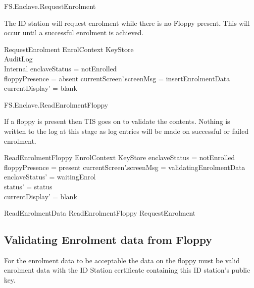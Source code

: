 \begin{traceunit}{FS.Enclave.RequestEnrolment}
\end{traceunit}


The ID station will request enrolment while there is no Floppy
present. This will occur until a successful enrolment is achieved.

\begin{schema}{RequestEnrolment}
        EnrolContext
\also
        \Xi KeyStore
\\      \Xi AuditLog
\\      \Xi Internal
\where
        enclaveStatus = notEnrolled
\\      floppyPresence = absent
\also
        currentScreen'.screenMsg = insertEnrolmentData
\also
        currentDisplay' = blank
\end{schema}

\begin{traceunit}{FS.Enclave.ReadEnrolmentFloppy}
\end{traceunit}

If a floppy is present then TIS goes on to validate the
contents. Nothing is written to the log at this stage as log entries
will be made on successful or failed enrolment.

\begin{schema}{ReadEnrolmentFloppy}
        EnrolContext
\also
        \Xi KeyStore
\where
        enclaveStatus = notEnrolled
\\      floppyPresence = present
\also
        currentScreen'.screenMsg = validatingEnrolmentData 
\also
        enclaveStatus' = waitingEnrol     
\\      status' = status
\\      currentDisplay' = blank                         
\end{schema}

\begin{zed}
        ReadEnrolmentData  ReadEnrolmentFloppy \lor RequestEnrolment
\end{zed}

\subsection{Validating Enrolment data from Floppy}

For the enrolment data to be acceptable the data on the floppy must be
valid enrolment data with the ID Station certificate containing this
ID station's public key. 

